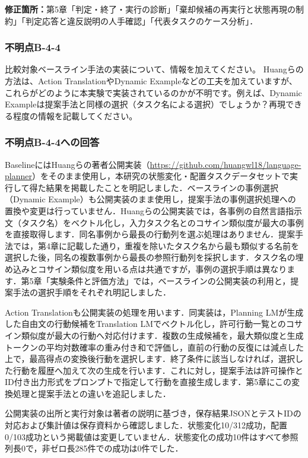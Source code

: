 \documentclass{jsarticle}
\begin{document}
\noindent\textbf{修正箇所：}第5章「判定・終了・実行の診断」「棄却候補の再実行と状態再現の制約」「判定応答と違反説明の人手確認」「代表タスクのケース分析」．


\subsubsection*{不明点B-4-4}
\begin{screen}
比較対象ベースライン手法の実装について、情報を加えてください。
Huangらの方法は、Action TranslationやDynamic Exampleなどの工夫を加えていますが、これらがどのように本実験で実装されているのかが不明です。例えば、Dynamic Exampleは提案手法と同様の選択（タスク名による選択）でしょうか？再現できる程度の情報を記載してください。
\end{screen}
\subsubsection*{不明点B-4-4への回答}
BaselineにはHuangらの著者公開実装（\url{https://github.com/huangwl18/language-planner}）をそのまま使用し，本研究の状態変化・配置タスクデータセットで実行して得た結果を掲載したことを明記しました．ベースラインの事例選択（Dynamic Example）も公開実装のまま使用し，提案手法の事例選択処理への置換や変更は行っていません．Huangらの公開実装では，各事例の自然言語指示文（タスク名）をベクトル化し，入力タスク名とのコサイン類似度が最大の事例を直接取得します．同名事例から最長の行動列を選ぶ処理はありません．提案手法では，第4章に記載した通り，重複を除いたタスク名から最も類似する名前を選択した後，同名の複数事例から最長の参照行動列を採択します．タスク名の埋め込みとコサイン類似度を用いる点は共通ですが，事例の選択手順は異なります．第5章「実験条件と評価方法」では，ベースラインの公開実装の利用と，提案手法の選択手順をそれぞれ明記しました．

Action Translationも公開実装の処理を用います．同実装は，Planning LMが生成した自由文の行動候補をTranslation LMでベクトル化し，許可行動一覧とのコサイン類似度が最大の行動へ対応付けます．複数の生成候補を，最大類似度と生成トークンの平均対数確率の重み付き和で評価し，直前の行動の反復には減点した上で，最高得点の変換後行動を選択します．終了条件に該当しなければ，選択した行動を履歴へ加えて次の生成を行います．これに対し，提案手法は許可操作とID付き出力形式をプロンプトで指定して行動を直接生成します．第5章にこの変換処理と提案手法との違いを追記しました．

公開実装の出所と実行対象は著者の説明に基づき，保存結果JSONとテストIDの対応および集計値は保存資料から確認しました．状態変化10/312成功，配置0/103成功という掲載値は変更していません．状態変化の成功10件はすべて参照列長0で，非ゼロ長285件での成功は0件でした．
\end{document}
